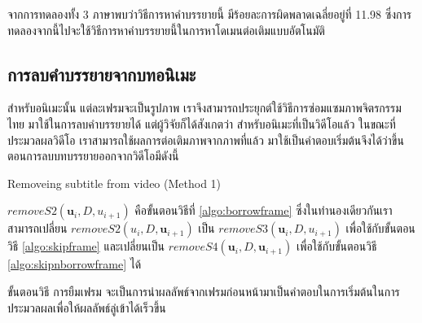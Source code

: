 	\hspace{1cm} จากการทดลองทั้ง  3 ภาษาพบว่าวิธีการหาคำบรรยายนี้ มีร้อยละการผิดพลาดเฉลี่ยอยู่ที่ 11.98 ซึ่งการทดลองจากนี้ไปจะใช้วิธีการหาคำบรรยายนี้ในการหาโดเมนต่อเติมแบบอัตโนมัติ

    \subsection{การลบคำบรรยายจากบทอนิเมะ}
	\hspace{1cm} สำหรับอนิเมะนั้น แต่ละเฟรมจะเป็นรูปภาพ เราจึงสามารถประยุกต์ใช้วิธีการซ่อมแซมภาพจิตรกรรมไทย มาใช้ในการลบคำบรรยายได้ แต่ผู้วิจัยก็ได้สังเกตว่า สำหรับอนิเมะที่เป็นวิดีโอแล้ว ในขณะที่ประมวลผลวิดีโอ เราสามารถใช้ผลการต่อเติมภาพจากภาพที่แล้ว มาใช้เป็นคำตอบเริ่มต้นจึงได้ว่าขึ้นตอนการลบบทบรรยายออกจากวิดีโอมีดังนี้\\
	
    \vspace{0.5cm}

    \begin{algorithm}[H]
		\SetAlgoNoLine
		\caption{Removeing subtitle from video (Method 1)}
	\end{algorithm}
	\vspace{0.5cm}
	\hspace{1cm}  $removeS2(\boldsymbol{u}_{i},D,u_{i+1})$  คือขั้นตอนวิธีที่ \ref{algo:borrowframe} ซึ่งในทำนองเดียวกันเราสามารถเปลี่ยน $removeS2(u_{i},D,\boldsymbol{u}_{i+1})$ เป็น $removeS3(\boldsymbol{u}_{i},D,u_{i+1})$ เพื่อใช้กับขั้นตอนวิธี \ref{algo:skipframe} และเปลี่ยนเป็น  $removeS4(\boldsymbol{u}_{i},D,\boldsymbol{u}_{i+1})$ เพื่อใช้กับขั้นตอนวิธี \ref{algo:skipnborrowframe} ได้ \\
	
	\vspace{0.5cm}
	
	\hspace{1cm} ขั้นตอนวิธี การยืมเฟรม จะเป็นการนำผลลัพธ์จากเฟรมก่อนหน้ามาเป็นคำตอบในการเริ่มต้นในการประมวลผลเพื่อให้ผลลัพธ์ลู่เข้าได้เร็วขึ้น \\
	
